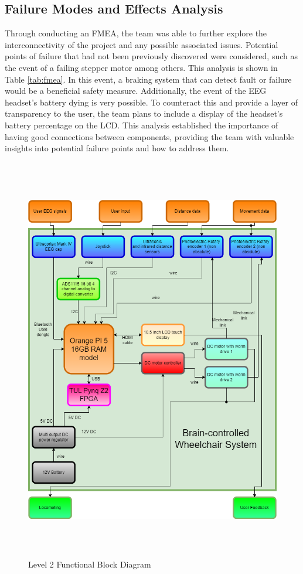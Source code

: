 \documentclass[conference]{IEEEtran}
\begin{document}
    \subsection{Failure Modes and Effects Analysis}
    Through conducting an FMEA, the team was able to further explore the interconnectivity of the project and any possible associated issues. Potential points of failure that had not been previously discovered were considered, such as the event of a failing stepper motor among others. This analysis is shown in Table \ref{tab:fmea}. In this event, a braking system that can detect fault or failure would be a beneficial safety measure. Additionally, the event of the EEG headset's battery dying is very possible. To counteract this and provide a layer of transparency to the user, the team plans to include a display of the headset's battery percentage on the LCD. This analysis established the importance of having good connections between components, providing the team with valuable insights into potential failure points and how to address them.   

    \onecolumn
    \begin{figure}
        \centering
        \centerline{\includegraphics[height=7in, keepaspectratio]{figs/D/level_2_diagram_1.png}}
        \caption{Level 2 Functional Block Diagram}
        \label{fig:level-2}
    \end{figure}
    
\end{document}
